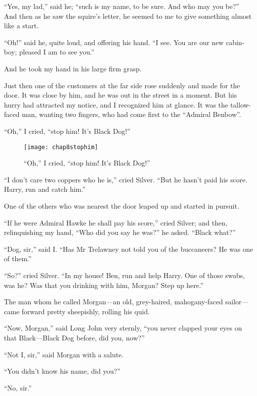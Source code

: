 \enquote{Yes, my lad,} said he; \enquote{such is my name, to be sure. And who may you be?} And then as he saw the squire’s letter, he seemed to me to give something almost like a start.

\enquote{Oh!} said he, quite loud, and offering his hand. \enquote{I see. You are our new cabin-boy; pleased I am to see you.}

And he took my hand in his large firm grasp.

Just then one of the customers at the far side rose suddenly and made for the door. It was close by him, and he was out in the street in a moment. But his hurry had attracted my notice, and I recognized him at glance. It was the tallow-faced man, wanting two fingers, who had come first to the \enquote{Admiral Benbow}.

\enquote{Oh,} I cried, \enquote{stop him! It’s Black Dog!}

\begin{sidewaysfigure}
\texttt{[image: chap8stophim]}%
\caption{\enquote{Oh,} I cried, \enquote{stop him! It’s Black Dog!}}
\end{sidewaysfigure}

\enquote{I don’t care two coppers who he is,} cried Silver. \enquote{But he hasn’t paid his score. Harry, run and catch him.}

One of the others who was nearest the door leaped up and started in pursuit.

\enquote{If he were Admiral Hawke he shall pay his score,} cried Silver; and then, relinquishing my hand, \enquote{Who did you say he was?} he asked. \enquote{Black what?}

\enquote{Dog, sir,} said I. \enquote{Has Mr Trelawney not told you of the buccaneers? He was one of them.}

\enquote{So?} cried Silver. \enquote{In my house! Ben, run and help Harry. One of those swabs, was he? Was that you drinking with him, Morgan? Step up here.}

The man whom he called Morgan---an old, grey-haired, mahogany-faced sailor---came forward pretty sheepishly, rolling his quid.

\enquote{Now, Morgan,} said Long John very sternly, \enquote{you never clapped your eyes on that Black---Black Dog before, did you, now?}

\enquote{Not I, sir,} said Morgan with a salute.

\enquote{You didn’t know his name, did you?}

\enquote{No, sir.}

